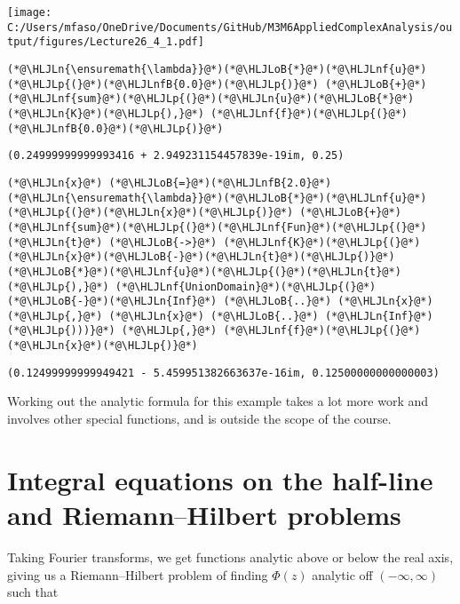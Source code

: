 \documentclass[12pt,a4paper]{article}
\newcommand{\HLJLn}[1]{#1}
\newcommand{\HLJLnf}[1]{\textcolor[RGB]{66,102,213}{#1}}
\newcommand{\HLJLnfB}[1]{\textcolor[RGB]{59,151,46}{#1}}
\newcommand{\HLJLoB}[1]{\textcolor[RGB]{102,102,102}{\textbf{#1}}}
\newcommand{\HLJLp}[1]{#1}
\def\endash{–}
\begin{document}
\texttt{[image: C:/Users/mfaso/OneDrive/Documents/GitHub/M3M6AppliedComplexAnalysis/output/figures/Lecture26\_4\_1.pdf]}

\begin{lstlisting}
(*@\HLJLn{\ensuremath{\lambda}}@*)(*@\HLJLoB{*}@*)(*@\HLJLnf{u}@*)(*@\HLJLp{(}@*)(*@\HLJLnfB{0.0}@*)(*@\HLJLp{)}@*) (*@\HLJLoB{+}@*)  (*@\HLJLnf{sum}@*)(*@\HLJLp{(}@*)(*@\HLJLn{u}@*)(*@\HLJLoB{*}@*)(*@\HLJLn{K}@*)(*@\HLJLp{),}@*) (*@\HLJLnf{f}@*)(*@\HLJLp{(}@*)(*@\HLJLnfB{0.0}@*)(*@\HLJLp{)}@*)
\end{lstlisting}

\begin{lstlisting}
(0.24999999999993416 + 2.949231154457839e-19im, 0.25)
\end{lstlisting}


\begin{lstlisting}
(*@\HLJLn{x}@*) (*@\HLJLoB{=}@*)(*@\HLJLnfB{2.0}@*)
(*@\HLJLn{\ensuremath{\lambda}}@*)(*@\HLJLoB{*}@*)(*@\HLJLnf{u}@*)(*@\HLJLp{(}@*)(*@\HLJLn{x}@*)(*@\HLJLp{)}@*) (*@\HLJLoB{+}@*)  (*@\HLJLnf{sum}@*)(*@\HLJLp{(}@*)(*@\HLJLnf{Fun}@*)(*@\HLJLp{(}@*)(*@\HLJLn{t}@*) (*@\HLJLoB{->}@*) (*@\HLJLnf{K}@*)(*@\HLJLp{(}@*)(*@\HLJLn{x}@*)(*@\HLJLoB{-}@*)(*@\HLJLn{t}@*)(*@\HLJLp{)}@*)(*@\HLJLoB{*}@*)(*@\HLJLnf{u}@*)(*@\HLJLp{(}@*)(*@\HLJLn{t}@*)(*@\HLJLp{),}@*) (*@\HLJLnf{UnionDomain}@*)(*@\HLJLp{(}@*)(*@\HLJLoB{-}@*)(*@\HLJLn{Inf}@*) (*@\HLJLoB{..}@*) (*@\HLJLn{x}@*)(*@\HLJLp{,}@*) (*@\HLJLn{x}@*) (*@\HLJLoB{..}@*) (*@\HLJLn{Inf}@*)(*@\HLJLp{)))}@*) (*@\HLJLp{,}@*) (*@\HLJLnf{f}@*)(*@\HLJLp{(}@*)(*@\HLJLn{x}@*)(*@\HLJLp{)}@*)
\end{lstlisting}

\begin{lstlisting}
(0.12499999999949421 - 5.459951382663637e-16im, 0.12500000000000003)
\end{lstlisting}


Working out the analytic formula for this example takes a lot more work and involves other special functions, and is outside the scope of the course.

\section{Integral equations on the half-line and Riemann\ensuremath{\endash}Hilbert problems}
Taking Fourier transforms, we get functions analytic above or below the real axis, giving us a Riemann\ensuremath{\endash}Hilbert problem of finding $\Phi(z)$ analytic off $(-\infty,\infty)$ such that
\end{document}
